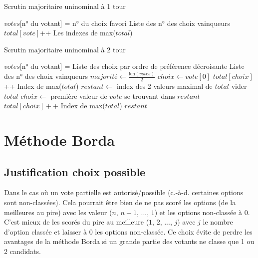 \documentclass[../report]{subfiles}
\begin{document}
  \begin{algorithm}
  \caption{Scrutin majoritaire uninominal à 1 tour}
  \label{scrutin:maj-uni-1t}
  \begin{algorithmic}[1]
  \REQUIRE $votes$[n° du votant] = n° du choix favori
  \ENSURE Liste des n° des choix vainqueurs
  \STATE $total[vote]$++
  \ENDFOR
  \RETURN Les indexes de max($total$)
  \end{algorithmic}
  \end{algorithm}
  
  \begin{algorithm}
  \caption{Scrutin majoritaire uninominal à 2 tour}
  \label{scrutin:maj-uni-2t}
  \begin{algorithmic}[1]
  \REQUIRE $votes$[n° du votant] = Liste des choix par ordre de préférence décroisante
  \ENSURE Liste des n° des choix vainqueurs
  \STATE $majorité \leftarrow \frac{\text{len}(votes)}{2} $
    \STATE $choix \leftarrow vote[0]$ 
    \STATE $total[choix]$++
  \ENDFOR
    \RETURN Index de max($total$)
  \ENDIF
  \STATE
  \STATE $restant \leftarrow $ index des 2 valeurs maximal de $total$
  \STATE vider $total$
    \STATE $choix \leftarrow $ première valeur de $vote$ se trouvant dans $restant$
    \STATE $total[choix]++$
  \ENDFOR
    \RETURN Index de max($total$)
  \ELSE
    \STATE {}
    \RETURN $restant$
  \ENDIF
  \end{algorithmic}
  \end{algorithm}
    
  
  \section{Méthode Borda}

  \subsection{Justification choix possible}

  Dans le cas où un vote partielle est autorisé/possible (c.-à-d. certaines options sont 
  non-classées).
  Cela pourrait être bien de ne pas scoré les options (de la meilleures au pire)
  avec les valeur ($n$, $n-1$, ..., $1$) et les options non-classée à $0$.
  C'est mieux de les scorés du pire au meilleure ($1$, $2$, ..., $j$) avec $j$ le nombre
  d'option classée et laisser à $0$ les options non-classée.
  Ce choix évite de perdre les avantages de la méthode Borda si un grande partie des votants
  ne classe que 1 ou 2 candidats.
  \cite{emerson_original_2013}
  
\end{document}

